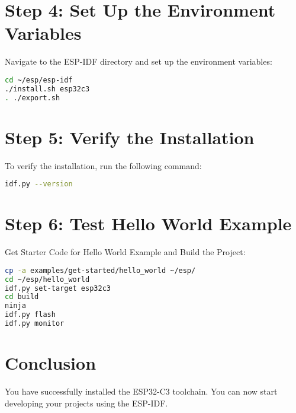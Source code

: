 \documentclass{article}
\begin{document}
\section{Step 4: Set Up the Environment Variables}
Navigate to the ESP-IDF directory and set up the environment variables:
\begin{lstlisting}[language=bash]
cd ~/esp/esp-idf
./install.sh esp32c3
. ./export.sh
\end{lstlisting}

\section{Step 5: Verify the Installation}
To verify the installation, run the following command:
\begin{lstlisting}[language=bash]
idf.py --version
\end{lstlisting}

\section{Step 6: Test Hello World Example}
Get Starter Code for Hello World Example and Build the Project:
\begin{lstlisting}[language=bash]
cp -a examples/get-started/hello_world ~/esp/
cd ~/esp/hello_world
idf.py set-target esp32c3
cd build
ninja
idf.py flash
idf.py monitor
\end{lstlisting}

\section{Conclusion}
You have successfully installed the ESP32-C3 toolchain. You can now start developing your projects using the ESP-IDF.
\end{document}
